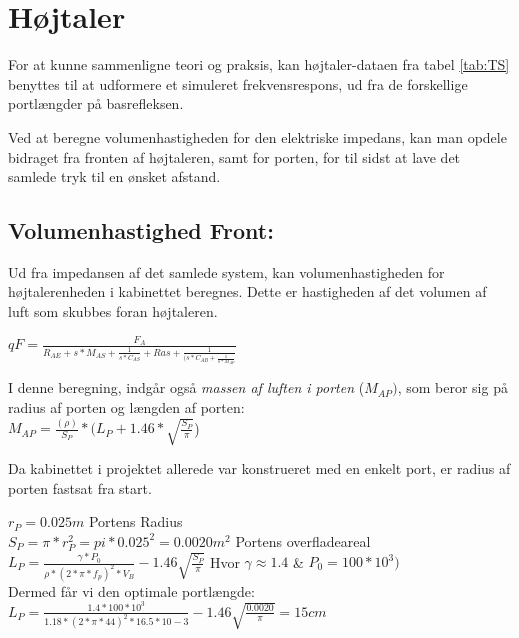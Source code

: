 \section{Højtaler}


For at kunne sammenligne teori og praksis, kan højtaler-dataen fra tabel \ref{tab:TS} benyttes til at udformere et simuleret frekvensrespons, ud fra de forskellige portlængder på basrefleksen. 

Ved at beregne volumenhastigheden for den elektriske impedans, kan man opdele bidraget fra fronten af højtaleren, samt for porten, for til sidst at lave det samlede tryk til en ønsket afstand. 


\subsection{Volumenhastighed Front:}
\label{sec:sim_calc}

Ud fra impedansen af det samlede system, kan volumenhastigheden for højtalerenheden i kabinettet beregnes. Dette er hastigheden af det volumen af luft som skubbes foran højtaleren. 

{\Large\(qF=\)}{\huge \(\frac{F_A}{R_{AE}+s*M_{AS}+\frac{1}{s*C_{AS}}+Ras+\frac{1}{(s*C_{AB}+\frac{1}{s*M_{AP}}}}\) }

I denne beregning, indgår også \textit{massen af luften i porten} ($M_{AP})$, som beror sig på radius af porten og længden af porten:\\

\(M_{AP}=\frac{(\rho)}{S_P}*(L_P+1.46*\sqrt{\frac{S_P}{\pi}}\))

Da kabinettet i projektet allerede var konstrueret med en enkelt port, er radius af porten fastsat fra start.

\(r_P=0.025 m\)		\hspace{6.2cm} Portens Radius\\
\(S_P=\pi*r_P^2=pi*0.025^2=0.0020 m^2\)		\hspace{2cm} Portens overfladeareal\\

\(L_P=\frac{\gamma*P_0}{\rho*(2*\pi*f_p)^2*V_{B}}-1.46\sqrt{\frac{S_P}{\pi}}\)			\hspace{3cm} Hvor $\gamma \approx 1.4$ \& $P_0=100*10^3)$\\

Dermed får vi den optimale portlængde:\\

\(L_P=\frac{1.4*100*10^3}{1.18*(2*\pi*44)^2*16.5*10-3}-1.46\sqrt{\frac{0.0020}{\pi}}=15cm\)


